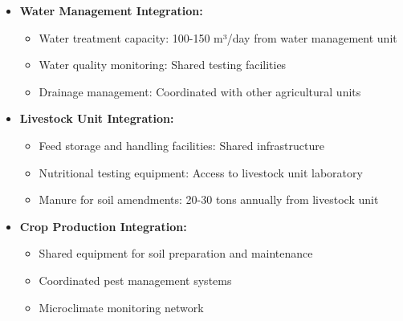 \begin{itemize}
    \item \textbf{Water Management Integration:}
    \begin{itemize}
        \item Water treatment capacity: 100-150 m³/day from water management unit
        \item Water quality monitoring: Shared testing facilities
        \item Drainage management: Coordinated with other agricultural units
    \end{itemize}
    \item \textbf{Livestock Unit Integration:}
    \begin{itemize}
        \item Feed storage and handling facilities: Shared infrastructure
        \item Nutritional testing equipment: Access to livestock unit laboratory
        \item Manure for soil amendments: 20-30 tons annually from livestock unit
    \end{itemize}
    \item \textbf{Crop Production Integration:}
    \begin{itemize}
        \item Shared equipment for soil preparation and maintenance
        \item Coordinated pest management systems
        \item Microclimate monitoring network
    \end{itemize}
\end{itemize}

